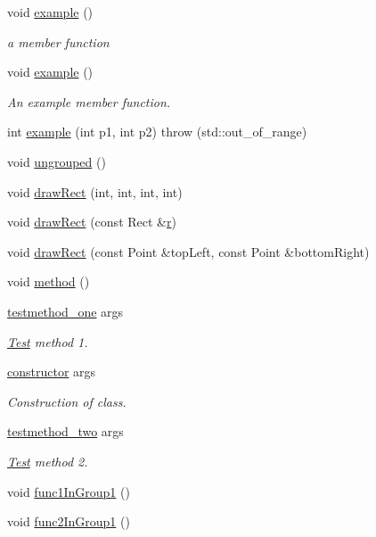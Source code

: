 \begin{DoxyCompactItemize}
\item 
void \hyperlink{class_test_a219565a812ad07b6517d74bdb36711ea}{example} ()
\begin{DoxyCompactList}\small\item\em a member function \end{DoxyCompactList}\item 
void \hyperlink{class_test_a219565a812ad07b6517d74bdb36711ea}{example} ()
\begin{DoxyCompactList}\small\item\em An example member function. \end{DoxyCompactList}\item 
int \hyperlink{class_test_a741b152810e5bab756cc06c9ded78f5f}{example} (int p1, int p2)  throw (std\+::out\+\_\+of\+\_\+range)
\item 
void \hyperlink{class_test_a2671fd85c5d94331067a9175ed326479}{ungrouped} ()
\item 
void \hyperlink{class_test_a6b16f6be500388342845646c1969d3aa}{draw\+Rect} (int, int, int, int)
\item 
void \hyperlink{class_test_aadf47113ad9dcd5600cb22e3bcff5258}{draw\+Rect} (const Rect \&\hyperlink{060__command__switch_8tcl_a0a0bd3dc69dd06934c4e6362155e0ace}{r})
\item 
void \hyperlink{class_test_a78e721f2e24a135158b9bd4c256d537e}{draw\+Rect} (const Point \&top\+Left, const Point \&bottom\+Right)
\item 
void \hyperlink{class_test_a2a91524f180391310e4e2735599b3f18}{method} ()
\item 
\hyperlink{class_test_a39186c5612153980286c3c02fd922060}{testmethod\+\_\+one} args
\begin{DoxyCompactList}\small\item\em \hyperlink{class_test}{Test} method 1. \end{DoxyCompactList}\item 
\hyperlink{class_test_a6e6c96de46eb90f3ad9f5f5106dfa0b9}{constructor} args
\begin{DoxyCompactList}\small\item\em Construction of class. \end{DoxyCompactList}\item 
\hyperlink{class_test_ae994ed622fec42a183b5bf5545b9769c}{testmethod\+\_\+two} args
\begin{DoxyCompactList}\small\item\em \hyperlink{class_test}{Test} method 2. \end{DoxyCompactList}\end{DoxyCompactItemize}
{\bf }\par
\begin{DoxyCompactItemize}
\item 
void \hyperlink{class_test_a63260e6eb6efa149aecf14f86c840c0b}{func1\+In\+Group1} ()
\item 
void \hyperlink{class_test_a489fece588ea476e504db5177a157060}{func2\+In\+Group1} ()
\end{DoxyCompactItemize}

